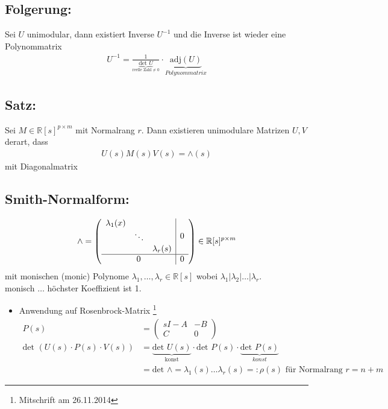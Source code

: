 \documentclass[ngerman]{tudscrreprt}
\begin{document}
\subsection*{Folgerung:} Sei $U$ unimodular, dann existiert Inverse $U^{-1}$ und die Inverse ist wieder eine Polynommatrix \begin{align*}
U^{-1} = \frac{1}{\underbrace{\text{det }U}_{\text{reelle Zahl}\ne 0}}\cdot \underbrace{\text{adj}(U)}_{Polynommatrix}
\end{align*}
\subsection*{Satz:} Sei $M \in \mathbb{R}[s]^{p\times m}$ mit Normalrang $r$. Dann existieren unimodulare Matrizen $U,V$ derart, dass \begin{align*}
U(s)M(s)V(s) = \wedge (s)
\end{align*}mit Diagonalmatrix 
\subsection*{Smith-Normalform:} \begin{align*}
\wedge = \left(\begin{array}{ c | c } 
\begin{matrix}\lambda_1(x) &&\\ & \ddots &\\ &&\lambda_r(s) \end{matrix} & 0 \\ \hline 0 & 0
\end{array}\right) \in \mathbb{R}[s]^{p\times m}
\end{align*}mit monischen (monic) Polynome $\lambda_1,\dots, \lambda_r \in \mathbb{R}[s]$ wobei $\lambda_1| \lambda_2| \dots| \lambda_r.$\\ 
monisch $\dots$ höchster Koeffizient ist 1.
\begin{itemize}
\item Anwendung auf Rosenbrock-Matrix \footnote{Mitschrift am 26.11.2014}
\begin{align*}
P(s) &= \begin{pmatrix} sI-A & -B\\ C & 0 \end{pmatrix}\\ \text{det }(U(s)\cdot P(s)\cdot V(s))&=\underbrace{\text{det }U(s)}_{\text{konst}}\cdot \text{det }P(s) \cdot \underbrace{\text{det }P(s)}_{konst}\\ &=\text{det }\wedge = \lambda_1(s) \dots \lambda_r(s) =: \rho(s) \text{ für Normalrang } r=n+m
\end{align*}
\end{itemize}
\end{document}
